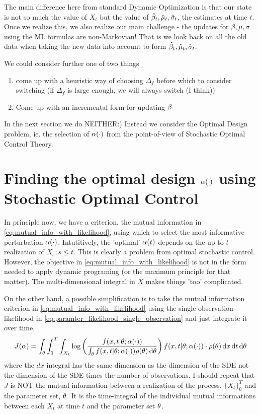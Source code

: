 The main difference here from standard Dynamic Optimization is
that our state is not so much the value of $X_t$ but the value of $\hat {\beta}_t,
\hat {{\mu }}_t, \hat {\sigma}_t$, the estimates at time $t$. Once we realize this, we also
realize our main challenge - the updates for $\beta, {\mu }, \sigma$ using the ML
formulas are non-Markovian! That is we look back on all the old
data when taking the new data into account to form $\hat {\beta}_t, \hat {{\mu }}_t, \hat
{\sigma}_t$. 

We could consider further one of two things
\begin{enumerate} 
  \item come up with a heuristic way of choosing $\Delta_f$ before which to
  consider switching (if $\Delta_f$ is large enough, we will always switch (I
  think))
  \item Come up with an incremental form for updating $\beta$
\end{enumerate}

In the next section we do NEITHER:) Instead we consider the Optimal Design
problem, ie. the selection of $\alpha(\cdot)$ from the point-of-view of
Stochastic Optimal Control Theory.



\section{Finding the optimal design $\alpha(\cdot)$ using Stochastic
Optimal Control}

In principle now, we have a criterion, the mutual information in
\cref{eq:mutual_info_with_likelihood}, using which to select the most
informative perturbation $\alpha(\cdot)$. Intutitively, the 'optimal'  $\alpha(t)$
depends on the up-to $t$ realization of $X_s ; s\leq t$. This is clearly a
problem from optimal stochastic control. However, the objective in
\cref{eq:mutual_info_with_likelihood} is not in the form needed to apply dynamic
programing (or the maximum principle for that matter). The multi-dimensional
integral in $X$ makes things 'too' complicated.

On the other hand, a possible simplification is to take the mutual information
criterion in \cref{eq:mutual_info_with_likelihood} using the single observation
likelihood in \cref{eq:paramter_likelihood_single_observation} and just
integrate it over time.
\begin{equation}
J(\alpha)  = \int_{ \theta} \int_0^T\int_{X_t}
 \log\left(\frac{f(x,t|{ \theta} ; \alpha(\cdot) )}
 			{\int_{ \theta} f(x,t|{ \theta}; \alpha(\cdot)) \rho({ \theta})\, \mathrm{d} { \theta}}\right) 
 f(x,t|{ \theta}; \alpha(\cdot)) \cdot \rho({ \theta}) \, \mathrm{d} x\, \mathrm{d} t\, \mathrm{d} { \theta}
\label{eq:mutual_info_time_integrated}
\end{equation}
where the $dx$ integral has the same dimension as the dimension of the SDE not
the dimension of the SDE times the number of observations. I should repeat that
$J$ is NOT the mutual information between a realization of the process, $\{
X_t\}_0^T$ and the parameter set, ${ \theta}$. It is the time-integral of the
individual mutual informations between each $X_t$ at time $t$ and the parameter
set ${ \theta}$. 

